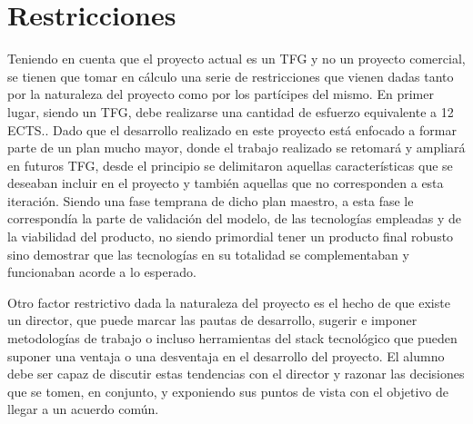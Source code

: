 \section{Restricciones} \label{phytoscheme.restricciones}
\par
Teniendo en cuenta que el proyecto actual es un TFG y no un proyecto comercial, se tienen que tomar en cálculo una serie de restricciones que vienen dadas tanto por la naturaleza del proyecto como por los partícipes del mismo. En primer lugar, siendo un TFG, debe realizarse una cantidad de esfuerzo equivalente a 12 ECTS.. Dado que el desarrollo realizado en este proyecto está enfocado a formar parte de un plan mucho mayor, donde el trabajo realizado se retomará y ampliará en futuros TFG, desde el principio se delimitaron aquellas características que se deseaban incluir en el proyecto y también aquellas que no corresponden a esta iteración.  Siendo una fase temprana de dicho plan maestro, a esta fase le correspondía la parte de validación del modelo, de las tecnologías empleadas y de la viabilidad del producto, no siendo primordial tener un producto final robusto sino demostrar que las tecnologías en su totalidad se complementaban y funcionaban acorde a lo esperado. 
\par
Otro factor restrictivo dada la naturaleza del proyecto es el hecho de que existe un director, que puede marcar las pautas de desarrollo, sugerir e imponer metodologías de trabajo o incluso herramientas del stack tecnológico que pueden suponer una ventaja o una desventaja en el desarrollo del proyecto. El alumno debe ser capaz de discutir estas tendencias con el director y razonar las decisiones que se tomen, en conjunto, y exponiendo sus puntos de vista con el objetivo de llegar a un acuerdo común. 




